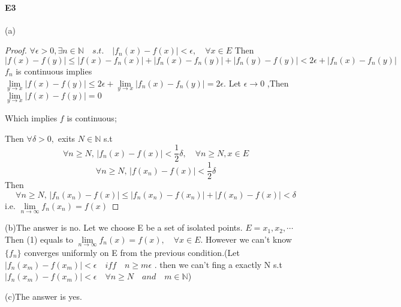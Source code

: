 \documentclass{article}
\begin{document}
\paragraph{E3}
(a)
\begin{proof}
    $ \forall \epsilon >0 ,\exists n\in \mathbb{N}\quad s.t.\quad |f_n(x)-f(x)|<\epsilon,\quad \forall x\in E $ Then
    \[|f(x)-f(y)| \leqslant |f(x)-f_n(x)|+|f_n(x)-f_n(y)|+|f_n(y)-f(y)|<2\epsilon+|f_n(x)-f_n(y)|\]
     $ f_n $ is continuous implies  $ \lim\limits_{y\to x}|f(x)-f(y)| \leqslant 2\epsilon+\lim\limits_{y\to x}|f_n(x)-f_n(y)|=2\epsilon   $. Let  $ \epsilon \rightarrow 0 $ ,Then  $ \lim\limits_{y\to x} |f(x)-f(y)|=0 $   
     
     Which implies  $ f  $ is continuous;

     Then $\forall \delta>0, $ exits  $ N\in \mathbb{N} $ s.t 
     \[\forall n\geqslant N,\, |f_n(x)-f(x)|<\frac{1}{2}\delta,\quad \forall n\geqslant N ,x\in E\]
     \[\forall n\geqslant N,\, |f(x_n)-f(x)|<\frac{1}{2}\delta\]
     Then 
     \[\forall n\geqslant N,\, |f_n(x_n)-f(x)| \leqslant |f_n(x_n)-f(x_n)|+|f(x_n)-f(x)|<\delta\]
     i.e.  $ \lim\limits_{n\to \infty} f_n(x_n) =f(x)  $ 
\end{proof}
(b)The answer is no. Let we choose E be a set of isolated points. $ E={x_1,x_2,\cdots} $ 
Then (1) equals to  $ \lim\limits_{n\to \infty} f_n(x) =f(x),\quad \forall x\in E$.
However we can't know  $ \{f_n\} $ converges uniformly on E from the previous condition.(Let  $ |f_n(x_m)-f(x_m)|<\epsilon \quad iff \quad n\geqslant m\epsilon     $ . then we can't fing a exactly N s.t  $ |f_n(x_m)-f(x_m)|< \epsilon \quad\forall n\geqslant N\quad and \quad m\in\mathbb{N} $)

(c)The answer is yes.
\end{document}
